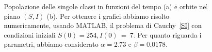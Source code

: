 \begin{figure}[ht]
\centering
\subfloat[][]{
\centering

}
\subfloat[][]
{

}
\caption[Analisi dei dati della peste di Eyam]{Popolazione delle singole classi  in funzioni del tempo (a) e orbite nel piano $(S,I)$ (b).  Per ottenere i grafici abbiamo risolto  numericamente, usando MATLAB,  il problema di Cauchy~\eqref{SI} con  condizioni iniziali $S(0)=254, I(0)~=~7$.  Per quanto riguarda i parametri, abbiamo considerato    $\alpha=2.73$  e $\beta= 0.0178$.}
\label{fig::sirsemplice}
\end{figure}



